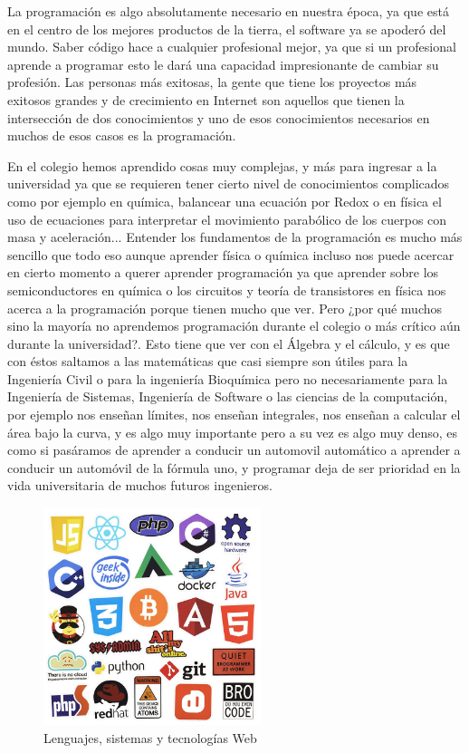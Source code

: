 \documentclass[twocolumns,a4paper]{IEEEtran}
\begin{document}
La programación es algo absolutamente necesario en nuestra época, ya que está
en el centro de los mejores productos de la tierra, el software ya se apoderó
del mundo. Saber código hace a cualquier profesional mejor, ya que si un
profesional aprende a programar esto le dará una capacidad impresionante de
cambiar su profesión. Las personas más exitosas, la gente que tiene los
proyectos más exitosos grandes y de crecimiento en Internet son aquellos que
tienen la intersección de dos conocimientos y uno de esos conocimientos
necesarios en muchos de esos casos es la programación.

En el colegio hemos aprendido cosas muy complejas, y más para ingresar a la
universidad ya que se requieren tener cierto nivel de conocimientos complicados
como por ejemplo en química, balancear una ecuación por Redox o en física el
uso de ecuaciones para interpretar el movimiento parabólico de los cuerpos con
masa y aceleración... Entender los fundamentos de la programación es mucho más
sencillo que todo eso aunque aprender física o química incluso nos puede
acercar en cierto momento a querer aprender programación ya que aprender sobre
los semiconductores en química o los circuitos y teoría de transistores en
física nos acerca a la programación porque tienen mucho que ver. Pero ¿por qué
muchos sino la mayoría no aprendemos programación durante el colegio o más
crítico aún durante la universidad?. Esto tiene que ver con el Álgebra y el
cálculo, y es que con éstos saltamos a las matemáticas que casi siempre son
útiles para la Ingeniería Civil o para la ingeniería Bioquímica pero no
necesariamente para la Ingeniería de Sistemas, Ingeniería de Software o las
ciencias de la computación, por ejemplo nos enseñan límites, nos enseñan
integrales, nos enseñan a calcular el área bajo la curva, y es algo muy
importante pero a su vez es algo muy denso, es como si pasáramos de aprender a
conducir un automovil automático a aprender a conducir un automóvil de la
fórmula uno, y programar deja de ser prioridad en la vida universitaria de
muchos futuros ingenieros.

\begin{figure}[t!]
   \centering
   \includegraphics[width=2.5in]{tec_web}
   \caption{Lenguajes, sistemas y tecnologías Web}\label{ref:FiguraA}
\end{figure}
\end{document}
